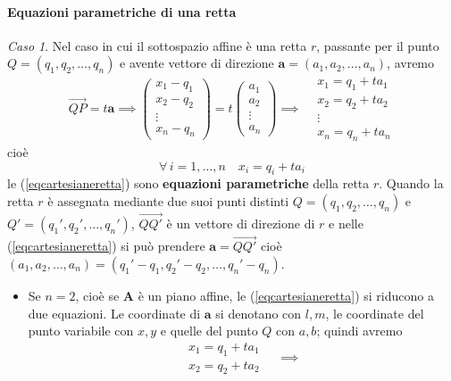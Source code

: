\documentclass{article}
\theoremstyle{plain}
\theoremstyle{definition}
\theoremstyle{remark}
\newtheorem{case}{Caso}
\begin{document}
\vspace{10pt}

\paragraph{Equazioni parametriche di una retta}
\begin{case}
Nel caso in cui il sottospazio affine è una retta $r$, passante per il punto 
$Q=(q_1,q_2,\ldots,q_n)$ e avente vettore di direzione 
$\mathbf{a}=(a_1,a_2,\ldots,a_n)$, avremo
\[\overrightarrow{QP}=t\mathbf{a}
\implies\begin{pmatrix}
    x_1-q_1\\
    x_2-q_2\\
    \vdots\\
    x_n-q_n
\end{pmatrix}=t\begin{pmatrix}
    a_{1}\\
    a_{2}\\
    \vdots\\
    a_{n}
\end{pmatrix}\implies \begin{array}{rcl}
    &x_1 =  q_1 + ta_1\\
    &x_2 =  q_2 + ta_2 \\
    & \vdots \\
    &x_n  = q_n + ta_n
\end{array}\]
cioè 
\begin{equation}\label{eqcartesianeretta}
    \forall\,i=1,\ldots,n\quad x_i=q_i+ta_{i}    
\end{equation}
le (\ref{eqcartesianeretta}) sono \textbf{equazioni parametriche} della retta $r$.
Quando la retta $r$ è assegnata mediante due suoi punti distinti $Q=(q_1,q_2,\ldots,q_n)$ e $Q'=(q_1',q_2',\ldots,q_n')$, $\overrightarrow{QQ'}$
è un vettore di direzione di $r$ e nelle (\ref{eqcartesianeretta}) si può prendere $\mathbf{a}=\overrightarrow{QQ'}$ cioè 
$(a_1,a_2,\ldots,a_n)=(q_1'-q_1,q_2'-q_2,\ldots,q_n'-q_n)$.
\begin{itemize}
    \item Se $n=2$, cioè se $\mathbf{A}$ è un piano affine, le (\ref{eqcartesianeretta}) si riducono a due equazioni. 
Le coordinate di $\mathbf{a}$ si denotano con $l,m$, le coordinate del punto variabile con $x,y$ e quelle del punto $Q$ con $a,b$; quindi avremo 
\[\begin{array}{rcl}
    &x_1 =  q_1 + ta_1\\
    &x_2 =  q_2 + ta_2 
\end{array}\quad\implies \begin{array}{rcl}

\end{array}\]
\end{itemize}
\end{case}
\end{document}
